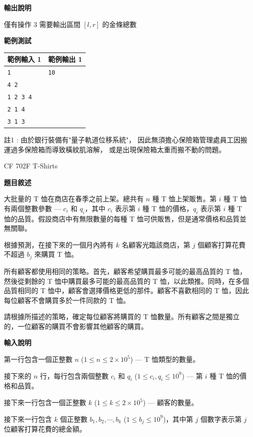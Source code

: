     \textbf{輸出說明}

    僅有操作 $3$ 需要輸出區間 $[l,r]$ 的金條總數

    \textbf{範例測試}

    \begin{tabular}{|m{7cm}|m{7cm}|}
        \hline
        範例輸入 1 & 範例輸出 1 \\
        \hline
        \verb|1| & \verb|10| \\
        \verb|4 2| & \\
        \verb|1 2 3 4| & \\
        \verb|2 1 4| & \\
        \verb|3 1 3| & \\
        \hline
    \end{tabular}

    註1 : 由於銀行裝備有"量子軌道位移系統"，
    因此無須擔心保險箱管理處員工因搬運過多保險箱而導致橫紋肌溶解，
    或是出現保險箱太重而搬不動的問題。

    \problem CF 702F T-Shirts

    \textbf{題目敘述}

    大批量的 T 恤在商店在春季之前上架。總共有 $n$ 種 T 恤上架販售。第 $i$ 種 T 恤有兩個整數參數 — $c_i$ 和 $q_i$，其中 $c_i$ 表示第 $i$ 種 T 恤的價格，$q_i$ 表示第 $i$ 種 T 恤的品質。假設商店中有無限數量的每種 T 恤可供販售，但是通常價格和品質並無關聯。

    根據預測，在接下來的一個月內將有 $k$ 名顧客光臨該商店，第 $j$ 個顧客打算花費不超過 $b_j$ 來購買 T 恤。

    所有顧客都使用相同的策略。首先，顧客希望購買最多可能的最高品質的 T 恤，然後從剩餘的 T 恤中購買最多可能的最高品質的 T 恤，以此類推。同時，在多個品質相同的 T 恤中，顧客會選擇價格更低的那件。顧客不喜歡相同的 T 恤，因此每位顧客不會購買多於一件同款的 T 恤。

    請根據所描述的策略，確定每位顧客將購買的 T 恤數量。所有顧客之間是獨立的，一位顧客的購買不會影響其他顧客的購買。

    \textbf{輸入說明}

    第一行包含一個正整數 $n$ ($1 \leq n \leq 2 \times 10^5$) — T 恤類型的數量。

    接下來的 $n$ 行，每行包含兩個整數 $c_i$ 和 $q_i$ ($1 \leq c_i, q_i \leq 10^9$) — 第 $i$ 種 T 恤的價格和品質。

    接下來一行包含一個正整數 $k$ ($1 \leq k \leq 2 \times 10^5$) — 顧客的數量。

    接下來一行包含 $k$ 個正整數 $b_1, b_2, \cdots, b_k$ ($1 \leq b_j \leq 10^9$)，其中第 $j$ 個數字表示第 $j$ 位顧客打算花費的總金額。

